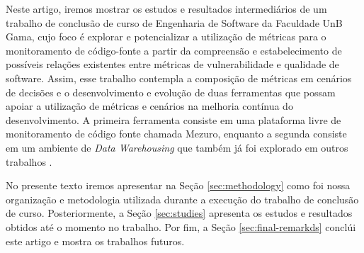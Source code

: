 Neste artigo, iremos mostrar os estudos e resultados intermediários de um trabalho de conclusão de curso de Engenharia de Software da Faculdade UnB Gama, cujo foco é explorar e potencializar a utilização de métricas para o monitoramento de código-fonte a partir da compreensão e estabelecimento de possíveis relações existentes entre métricas de vulnerabilidade e qualidade de software. Assim, esse trabalho contempla a composição de métricas em cenários de decisões e o desenvolvimento e evolução de duas ferramentas que possam apoiar a utilização de métricas e cenários na melhoria contínua do desenvolvimento. A primeira ferramenta consiste em uma plataforma livre de monitoramento de código fonte chamada Mezuro, enquanto a segunda consiste em um ambiente de \emph{Data Warehousing} que também já foi explorado em outros trabalhos \cite{Silveira2010}\cite{mazuco2011}.

No presente texto iremos apresentar na Seção \ref{sec:methodology} como foi nossa organização e metodologia utilizada durante a execução do trabalho de conclusão de curso. Posteriormente, a Seção \ref{sec:studies} apresenta os estudos e resultados obtidos até o momento no trabalho. Por fim, a Seção \ref{sec:final-remarkds} conclúi este artigo e mostra os trabalhos futuros.
